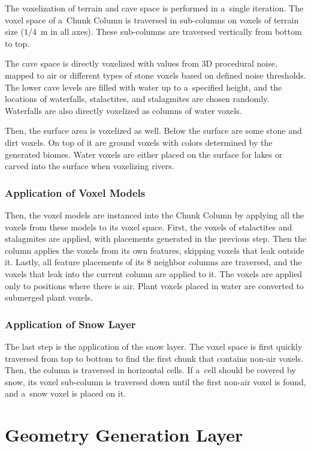 The voxelization of terrain and cave space is performed in a~single iteration. The voxel space of a~Chunk Column is traversed in sub-columns on voxels of terrain size ($1/4$~m in all axes). These sub-columns are traversed vertically from bottom to top.

The cave space is directly voxelized with values from 3D procedural noise, mapped to air or different types of stone voxels based on defined noise thresholds. The lower cave levels are filled with water up to a~specified height, and the locations of waterfalls, stalactites, and stalagmites are chosen randomly. Waterfalls are also directly voxelized as columns of water voxels.

Then, the surface area is voxelized as well. Below the surface are some stone and dirt voxels. On top of it are ground voxels with colors determined by the generated biomes. Water voxels are either placed on the surface for lakes or carved into the surface when voxelizing rivers.

\subsubsection{Application of Voxel Models}

Then, the voxel models are instanced into the Chunk Column by applying all the voxels from these models to its voxel space. First, the voxels of stalactites and stalagmites are applied, with placements generated in the previous step. Then the column applies the voxels from its own features, skipping voxels that leak outside it. Lastly, all feature placements of its 8 neighbor columns are traversed, and the voxels that leak into the current column are applied to it. The voxels are applied only to positions where there is air. Plant voxels placed in water are converted to submerged plant voxels.

\subsubsection{Application of Snow Layer}

The last step is the application of the snow layer. The voxel space is first quickly traversed from top to bottom to find the first chunk that contains non-air voxels. Then, the column is traversed in horizontal cells. If a~cell should be covered by snow, its voxel sub-column is traversed down until the first non-air voxel is found, and a~snow voxel is placed on it.


\section{Geometry Generation Layer}



